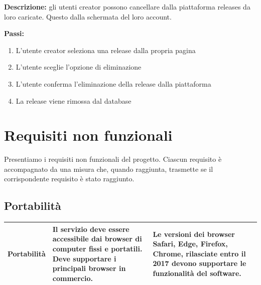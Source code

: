 \documentclass[a4paper,12pt]{article}
\begin{document}
\textbf{Descrizione:} gli utenti creator possono cancellare dalla piattaforma releases da loro caricate. Questo dalla schermata del loro account.

\textbf{Passi:}
\begin{enumerate}
    \item L’utente creator seleziona una release dalla propria pagina
    \item L'utente sceglie l’opzione di eliminazione
    \item L'utente conferma l’eliminazione della release dalla piattaforma
    \item La release viene rimossa dal database    
\end{enumerate}

\newpage
\section{Requisiti non funzionali}

Presentiamo i requisiti non funzionali del progetto. Ciascun requisito è accompagnato da una misura che, quando raggiunta, trasmette se il corrispondente requisito è stato raggiunto.

\subsection*{Portabilità}

{
    \centering
    \begin{tabularx}{\textwidth}{|l|>{\raggedright\arraybackslash}X|>{\raggedright\arraybackslash}X|>{\raggedright\arraybackslash}X|}
    \hline
    Portabilità & Il servizio deve essere accessibile dai browser di computer fissi e portatili. Deve supportare i principali browser in commercio. & Le versioni dei browser Safari, Edge, Firefox, Chrome, rilasciate entro il 2017 devono supportare le funzionalità del software. \\
    \hline
    \end{tabularx} \par
}
\end{document}
